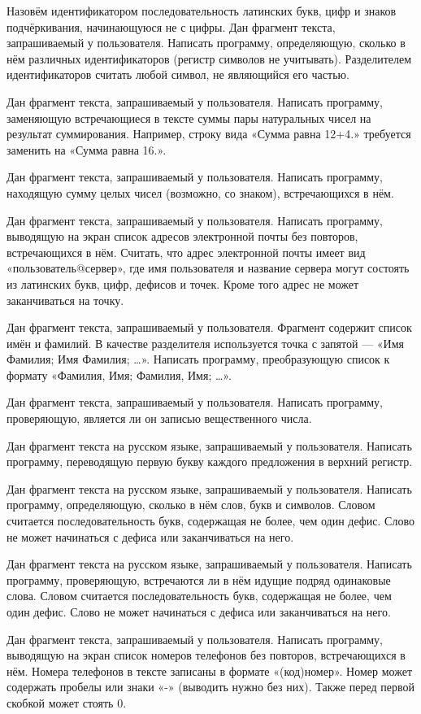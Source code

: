 \task Назовём идентификатором последовательность латинских букв, цифр
и знаков подчёркивания, начинающуюся не с цифры. Дан фрагмент текста,
запрашиваемый у пользователя. Написать программу, определяющую,
сколько в нём различных идентификаторов (регистр символов не
учитывать). Разделителем идентификаторов считать любой символ, не
являющийся его частью.

\task Дан фрагмент текста, запрашиваемый у пользователя. Написать
программу, заменяющую встречающиеся в тексте суммы пары натуральных чисел
на результат суммирования. Например, строку вида «Сумма равна 12+4.»
требуется заменить на «Сумма равна 16.».

\task Дан фрагмент текста, запрашиваемый у пользователя. Написать
программу, находящую сумму целых чисел (возможно, со знаком),
встречающихся в нём.

\task Дан фрагмент текста, запрашиваемый у пользователя. Написать
программу, выводящую на экран список адресов электронной почты без
повторов, встречающихся в нём. Считать, что адрес электронной почты
имеет вид «пользователь@сервер», где имя пользователя и название
сервера могут состоять из латинских букв, цифр, дефисов и точек.
Кроме того адрес не может заканчиваться на точку.

\task Дан фрагмент текста, запрашиваемый у пользователя. Фрагмент
содержит список имён и фамилий. В качестве разделителя используется
точка с запятой — «Имя Фамилия; Имя Фамилия; …». Написать программу,
преобразующую список к формату «Фамилия, Имя; Фамилия, Имя; …».

\task Дан фрагмент текста, запрашиваемый у пользователя. Написать
программу, проверяющую, является ли он записью вещественного числа.

\task Дан фрагмент текста на русском языке, запрашиваемый у
пользователя. Написать программу, переводящую первую букву каждого
предложения в верхний регистр.

\task Дан фрагмент текста на русском языке, запрашиваемый у пользователя.
Написать программу, определяющую, сколько в нём слов, букв и символов.
Словом считается последовательность букв, содержащая не более, чем один
дефис. Слово не может начинаться с дефиса или заканчиваться на него.

\task Дан фрагмент текста на русском языке, запрашиваемый у пользователя.
Написать программу, проверяющую, встречаются ли в нём идущие подряд
одинаковые слова. Словом считается последовательность букв, содержащая
не более, чем один дефис. Слово не может начинаться с дефиса или
заканчиваться на него.

\task Дан фрагмент текста, запрашиваемый у пользователя. Написать
программу, выводящую на экран список номеров телефонов без повторов,
встречающихся в нём. Номера телефонов в тексте записаны в формате
«(код)номер». Номер может содержать пробелы или знаки «-» (выводить нужно
без них). Также перед первой скобкой может стоять 0.
